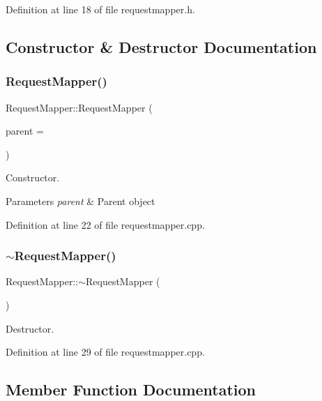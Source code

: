Definition at line 18 of file requestmapper.\+h.



\subsection{Constructor \& Destructor Documentation}
\mbox{\label{class_request_mapper_aeab4be2b6943c3e8856e4d3aab023b71}} 
\subsubsection{\texorpdfstring{Request\+Mapper()}{RequestMapper()}}
{\footnotesize\ttfamily Request\+Mapper\+::\+Request\+Mapper (\begin{DoxyParamCaption}\item[{Q\+Object $\ast$}]{parent = {} }\end{DoxyParamCaption})}

Constructor. 
\begin{DoxyParams}{Parameters}
{\em parent} & Parent object \\
\hline
\end{DoxyParams}


Definition at line 22 of file requestmapper.\+cpp.

\mbox{\label{class_request_mapper_af70f9ba02375a818287f4a91aad23ead}} 
\subsubsection{\texorpdfstring{$\sim$\+Request\+Mapper()}{~RequestMapper()}}
{\footnotesize\ttfamily Request\+Mapper\+::$\sim$\+Request\+Mapper (\begin{DoxyParamCaption}{ }\end{DoxyParamCaption})}

Destructor. 

Definition at line 29 of file requestmapper.\+cpp.



\subsection{Member Function Documentation}
\mbox{\label{class_request_mapper_a5faa3e99e8599b260d2c9ec1479b6419}} 

